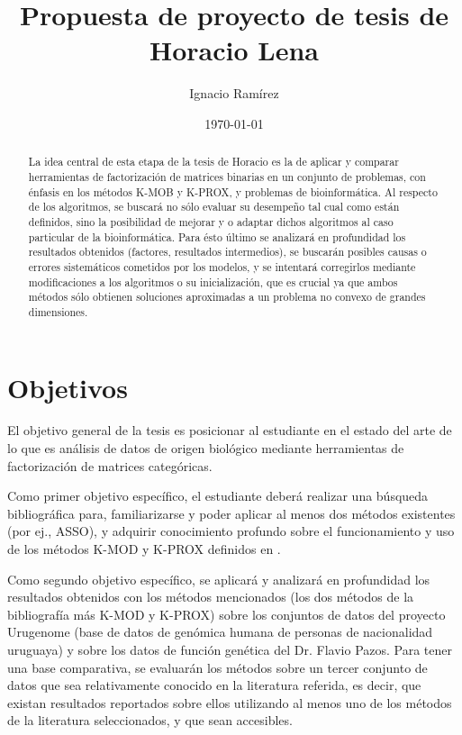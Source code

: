 \documentclass{article}
\title{Propuesta de proyecto de tesis de Horacio Lena}
\author{Ignacio Ram\'{i}rez}
\date{\today}
\theoremstyle{definition}
\begin{document}
%
\maketitle
%
\begin{abstract}
La idea central de esta etapa de la tesis de Horacio es la de aplicar y comparar herramientas de factorización de matrices binarias en un conjunto de problemas, con énfasis  en los métodos K-MOB y K-PROX, y problemas de bioinformática. Al respecto de los algoritmos, se buscará no sólo evaluar su desempeño tal cual como están definidos, sino la posibilidad de mejorar y o adaptar dichos algoritmos al caso particular de la bioinformática. Para ésto último se analizará en profundidad los resultados obtenidos (factores, resultados intermedios), se buscarán posibles causas o errores sistemáticos cometidos por los modelos, y se intentará corregirlos mediante modificaciones a los algoritmos o su inicialización, que es crucial ya que ambos métodos sólo obtienen soluciones aproximadas a un problema no convexo de grandes dimensiones.
\end{abstract}

\section{Objetivos}

El objetivo general de la tesis es posicionar al estudiante en el estado del arte de lo que es análisis de datos de origen biológico mediante herramientas de factorización de matrices categóricas.

Como primer objetivo específico, el estudiante deberá realizar una búsqueda bibliográfica para, familiarizarse y poder aplicar al menos dos métodos existentes (por ej., ASSO), y adquirir conocimiento profundo sobre el funcionamiento y uso de los métodos K-MOD y K-PROX definidos en \cite{bmf}.

Como segundo objetivo específico, se aplicará y analizará en profundidad los resultados obtenidos con los métodos mencionados (los dos métodos de la bibliografía más K-MOD y K-PROX) sobre los conjuntos de datos del proyecto Urugenome (base de datos de genómica humana de personas de nacionalidad uruguaya) y sobre los datos de función genética del Dr. Flavio Pazos.
Para tener una base comparativa, se evaluarán los métodos sobre un tercer conjunto de datos que sea relativamente conocido en la literatura referida, es decir, que existan resultados reportados sobre ellos utilizando al menos uno de los métodos de la literatura seleccionados, y que sean accesibles.
\end{document}
